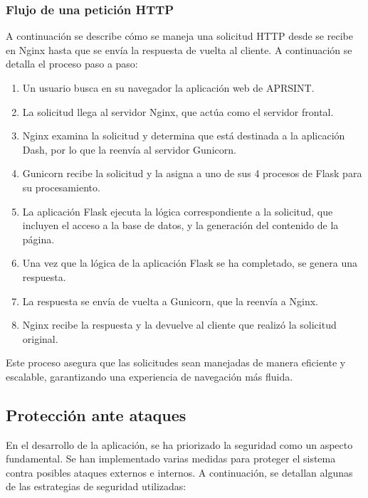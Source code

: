 \subsubsection*{Flujo de una petición HTTP}

A continuación se describe cómo se maneja una solicitud HTTP desde se recibe en Nginx hasta que se envía la respuesta de vuelta al cliente. A continuación se detalla el proceso paso a paso:

\begin{enumerate}
	\item Un usuario busca en su navegador la aplicación web de APRSINT.
	\item La solicitud llega al servidor Nginx, que actúa como el servidor frontal.
	\item Nginx examina la solicitud y determina que está destinada a la aplicación Dash, por lo que la reenvía al servidor Gunicorn.
	\item Gunicorn recibe la solicitud y la asigna a uno de sus 4 procesos de Flask para su procesamiento.
	\item La aplicación Flask ejecuta la lógica correspondiente a la solicitud, que incluyen el acceso a la base de datos, y la generación del contenido de la página.
	\item Una vez que la lógica de la aplicación Flask se ha completado, se genera una respuesta.
	\item La respuesta se envía de vuelta a Gunicorn, que la reenvía a Nginx.
	\item Nginx recibe la respuesta y la devuelve al cliente que realizó la solicitud original.
\end{enumerate}

Este proceso asegura que las solicitudes sean manejadas de manera eficiente y escalable, garantizando una experiencia de navegación más fluida.

\subsection{Protección ante ataques}

En el desarrollo de la aplicación, se ha priorizado la seguridad como un aspecto fundamental. Se han implementado varias medidas \cite{RpiSecure} para proteger el sistema contra posibles ataques externos e internos. A continuación, se detallan algunas de las estrategias de seguridad utilizadas:


